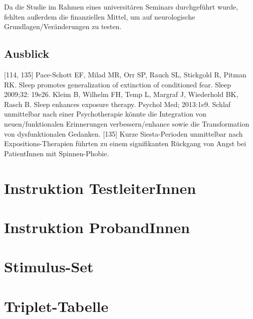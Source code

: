 Da die Studie im Rahmen eines universitären Seminars durchgeführt wurde, fehlten außerdem die finanziellen Mittel, um auf neurologische Grundlagen/Veränderungen zu testen.


\subsection{Ausblick}
[114, 135]
Pace-Schott EF, Milad MR, Orr SP, Rauch SL, Stickgold R, Pitman RK. Sleep promotes generalization of extinction of conditioned fear. Sleep 2009;32: 19e26.
Kleim B, Wilhelm FH, Temp L, Margraf J, Wiederhold BK, Rasch B. Sleep enhances exposure therapy. Psychol Med; 2013:1e9.
Schlaf unmittelbar nach einer Psychotherapie könnte die Integration von neuen/funktionalen Erinnerungen verbessern/enhance sowie die Transformation von dysfunktionalen Gedanken.
[135] Kurze Siesta-Perioden unmittelbar nach Expositions-Therapien führten zu einem signifikanten Rückgang von Angst bei PatientInnen mit Spinnen-Phobie.

\newpage


%


\clearpage
\appendix
{} %
\renewcommand*{\thesection}{\Alph{section}}

\section{Instruktion TestleiterInnen}

\newpage

\section{Instruktion ProbandInnen}

\newpage

\section{Stimulus-Set}

\newpage

\section{Triplet-Tabelle}

\newpage
\clearpage


